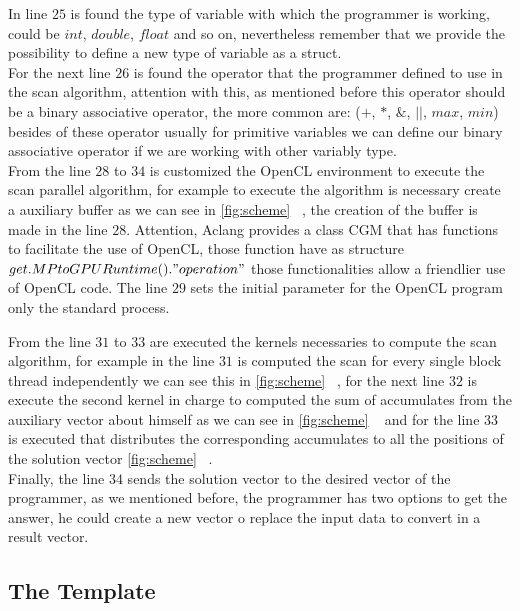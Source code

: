 \documentclass[Ingles]{ic-tese-v1}
\begin{document}
In line $25$ is found the type of variable with which the programmer is working, could be $int$, $double$, $float$ and so on, nevertheless remember that we provide the possibility to define a new type of variable as a struct.\\
For the next line $26$ is found the operator that the programmer defined to use in the scan algorithm, attention with this, as mentioned before this operator should be a binary associative operator, the more common are: ($+$, $*$, $\&$, $||$, $max$, $min$) besides of these operator usually for primitive variables we can define our binary associative operator if we are working with other variably type. \\

From the line $28$ to $34$ is customized the OpenCL environment to execute the scan parallel algorithm, for example to execute the algorithm is necessary create a auxiliary buffer as we can see in \ref{fig:scheme} ~, the creation of the buffer is made in the line $28$. Attention, Aclang provides a class CGM that has functions to facilitate the use of OpenCL, those function have as structure $get.MPtoGPURuntime()."operation"$ those functionalities allow a friendlier use of OpenCL code. The line $29$ sets the initial parameter for the OpenCL program only the standard process.

From the line $31$ to $33$ are executed the kernels necessaries to compute the scan algorithm, for example in the line $31$ is computed the scan for every single block thread independently we can see this in \ref{fig:scheme} ~, for the next line $32$ is execute the second kernel in charge to computed the sum of accumulates from the auxiliary vector about himself as we can see in \ref{fig:scheme} ~ and for the line $33$ is executed that distributes the corresponding accumulates to all the positions of the solution vector \ref{fig:scheme} ~.\\
Finally, the line $34$ sends the solution vector to the desired vector of the programmer, as we mentioned before, the programmer has two options to get the answer, he could create a new vector o replace the input data to convert in a result vector.\\

\subsection{The Template}
\label{sec:template}
\end{document}
